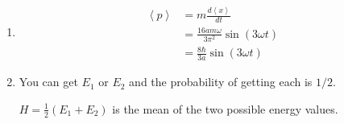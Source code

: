 \documentclass{article}
\newcommand{\ev}[1]{\left< #1 \right>}
\begin{document}
\begin{enumerate}
  \item

        \begin{align*}
          \ev{p} & = m \frac{d \ev{x}}{d t}                          \\
                 & = \frac{16 a m \omega}{3 \pi^2} \sin (3 \omega t) \\
                 & = \frac{8 \hbar}{3 a} \sin (3 \omega t)
        \end{align*}

  \item You can get $E_1$ or $E_2$ and the probability of getting each is $1 / 2$.

        $H = \frac{1}{2} (E_1 + E_2)$ is the mean of the two possible energy values.
\end{enumerate}

\subsection{}
\end{document}

